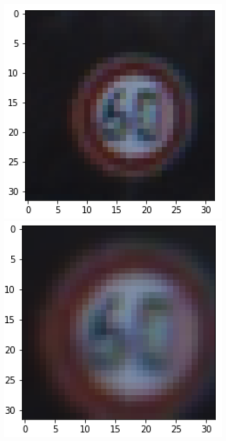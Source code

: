 \documentclass[12pt]{article}
\begin{document}
\begin{figure}[!h]
\includegraphics[scale = 0.5]{writeup_images/im1.png}
\includegraphics[scale = 0.5]{writeup_images/cropped.png}
\end{figure}
\end{document}
